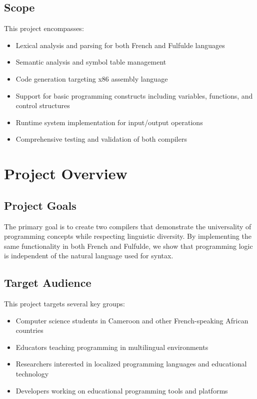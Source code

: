 \documentclass[12pt,a4paper]{article}
\begin{document}
\subsection{Scope}

This project encompasses:

\begin{itemize}
    \item Lexical analysis and parsing for both French and Fulfulde languages
    \item Semantic analysis and symbol table management
    \item Code generation targeting x86 assembly language
    \item Support for basic programming constructs including variables, functions, and control structures
    \item Runtime system implementation for input/output operations
    \item Comprehensive testing and validation of both compilers
\end{itemize}

\section{Project Overview}

\subsection{Project Goals}

The primary goal is to create two compilers that demonstrate the universality of programming concepts while respecting linguistic diversity. By implementing the same functionality in both French and Fulfulde, we show that programming logic is independent of the natural language used for syntax.

\subsection{Target Audience}

This project targets several key groups:

\begin{itemize}
    \item Computer science students in Cameroon and other French-speaking African countries
    \item Educators teaching programming in multilingual environments
    \item Researchers interested in localized programming languages and educational technology
    \item Developers working on educational programming tools and platforms
\end{itemize}
\end{document}

